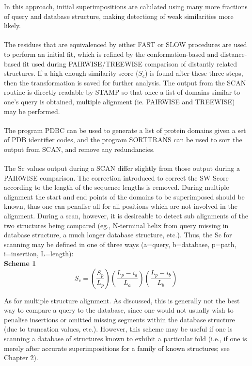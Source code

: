In this approach, initial superimpositions are calulated using many more fractions of query and
database structure, making detectiong of weak similarities more likely.\\
\\
The residues that are
equivalenced by either FAST or SLOW procedures are used to perform an initial fit, which is
refined by the conformation-based and distance-based fit used during 
PAIRWISE/TREEWISE comparison of distantly related structures.  If a 
high enough similarity score ($S_{c}$) is found after these three
steps, then the transformation is saved for further analysis.
The output from the SCAN routine is directly readable by STAMP so
that once a list of domains similar to one's query is obtained,
multiple alignment (ie. PAIRWISE and TREEWISE) may be performed.\\
\\
The program PDBC can be used to generate a list of protein domains 
given a set of PDB identifier codes, and the program SORTTRANS can
be used to sort the output from SCAN, and remove any redundancies.\\
\\
The Sc values output during a SCAN differ slightly from those
output during a PAIRWISE comparison.  The correction  introduced 
to correct the SW Score according to the length of the sequence 
lengths is removed.   During multiple alignment the start and end  
points of the domains to be superimposed should be known, thus one 
can penalise all for all positions which are not involved in the 
alignment.  During a scan, however, it is desireable to detect sub 
alignments of the two structures being compared (eg., N-terminal helix 
from query missing in database structure, a much longer database 
structure, etc.).  Thus, the Sc for scanning may be defined in one of 
three ways (a=query, b=database, p=path, i=insertion, L=length):\\

{\bf Scheme 1}\\
\[
S_{c} =
\left(
\frac{S_{p}}{L_{p}}
\right)
\left(
\frac{L_{p}-i_{a}}{L_{a}}
\right)
\left(
\frac{L_{p}-i_{b}}{L_{b}}
\right)
\]

As for multiple structure alignment.   As discussed, this is generally not the 
best way to compare a 
query to the database, since one would not usually wish to penalise insertions
or omitted missing segments within the database structure (due to truncation values,
etc.).  However, this scheme may be useful if one is scanning a database of
structures known to exhibit a particular fold (i.e., if one is merely after 
accurate superimpositions for a family of known structures; see Chapter 2).\\

